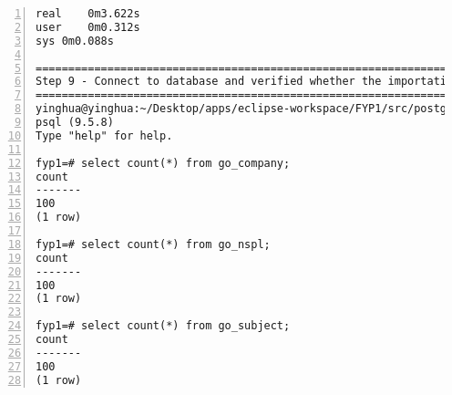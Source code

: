 \begin{lstlisting}[breaklines, frame=single, numbers=left, caption={Linux command for import data}, label=commandline-02]
real	0m3.622s
user	0m0.312s
sys	0m0.088s

===============================================================================
Step 9 - Connect to database and verified whether the importation is success
===============================================================================
yinghua@yinghua:~/Desktop/apps/eclipse-workspace/FYP1/src/postgres-process$ psql fyp1;
psql (9.5.8)
Type "help" for help.

fyp1=# select count(*) from go_company;
count 
-------
100
(1 row)

fyp1=# select count(*) from go_nspl;
count 
-------
100
(1 row)

fyp1=# select count(*) from go_subject;
count 
-------
100
(1 row)

\end{lstlisting}


